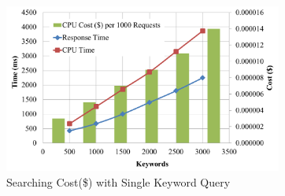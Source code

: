 \begin{figure}
  \centering
  \includegraphics[width= 3.6in]{figures/cost_keywords_graph.png}
  \caption{Searching Cost(\$) with Single Keyword Query}
  \label{fig:cost_single_query}
\end{figure}
